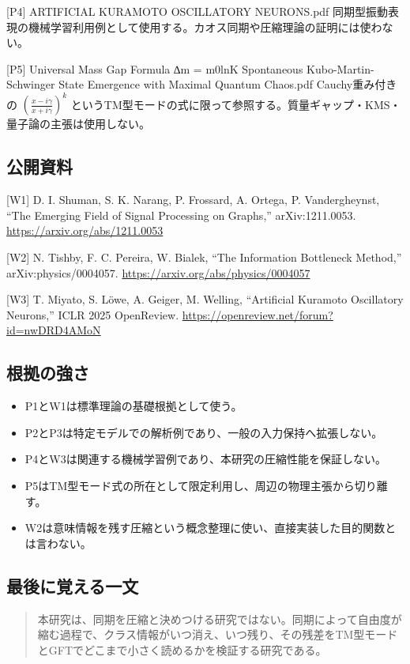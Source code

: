 \documentclass[11pt,a4paper]{ltjsarticle}
\newenvironment{keyquote}{%
  \begin{quote}\color{researchteal}\bfseries\large%
}{%
  \end{quote}%
}
\begin{document}
[P4] \textcolor{researchblue}{ARTIFICIAL KURAMOTO OSCILLATORY NEURONS.pdf} 同期型振動表現の機械学習利用例として使用する。カオス同期や圧縮理論の証明には使わない。\par

[P5] \textcolor{researchblue}{Universal Mass Gap Formula ∆m = m0lnK Spontaneous Kubo-Martin-Schwinger State Emergence with Maximal Quantum Chaos.pdf} Cauchy重み付きの \(\left(\frac{x-i\gamma}{x+i\gamma}\right)^k\) というTM型モードの式に限って参照する。質量ギャップ・KMS・量子論の主張は使用しない。\par

\subsection*{\textcolor{researchblue}{公開資料}}

[W1] D. I. Shuman, S. K. Narang, P. Frossard, A. Ortega, P. Vandergheynst, “The Emerging Field of Signal Processing on Graphs,” arXiv:1211.0053. \url{https://arxiv.org/abs/1211.0053}\par

[W2] N. Tishby, F. C. Pereira, W. Bialek, “The Information Bottleneck Method,” arXiv:physics/0004057. \url{https://arxiv.org/abs/physics/0004057}\par

[W3] T. Miyato, S. Löwe, A. Geiger, M. Welling, “Artificial Kuramoto Oscillatory Neurons,” ICLR 2025 OpenReview. \url{https://openreview.net/forum?id=nwDRD4AMoN}\par

\subsection*{\textcolor{researchblue}{根拠の強さ}}

\begin{itemize}

\item P1とW1は標準理論の基礎根拠として使う。

\item P2とP3は特定モデルでの解析例であり、一般の入力保持へ拡張しない。

\item P4とW3は関連する機械学習例であり、本研究の圧縮性能を保証しない。

\item P5はTM型モード式の所在として限定利用し、周辺の物理主張から切り離す。

\item W2は意味情報を残す圧縮という概念整理に使い、直接実装した目的関数とは言わない。

\end{itemize}

\par\medskip{\color{researchline}\hrule}\medskip

\subsection*{\textcolor{researchblue}{最後に覚える一文}}

\begin{keyquote}

本研究は、同期を圧縮と決めつける研究ではない。同期によって自由度が縮む過程で、クラス情報がいつ消え、いつ残り、その残差をTM型モードとGFTでどこまで小さく読めるかを検証する研究である。

\end{keyquote}
\end{document}
